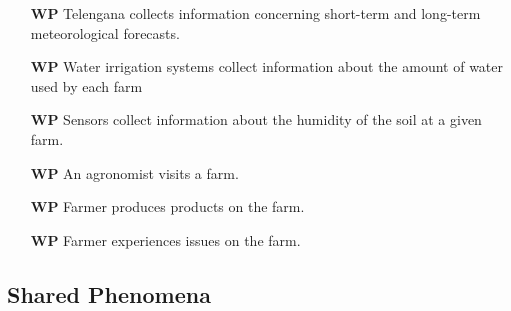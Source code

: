 \begin{itemize}
    \item [\textbf{WP}] Telengana collects information concerning short-term and long-term meteorological forecasts.
    \item [\textbf{WP}] Water irrigation systems collect information about the amount of water used by each farm
    \item [\textbf{WP}] Sensors collect information about the humidity of the soil at a given farm.
    \item [\textbf{WP}] An agronomist visits a farm.
    \item [\textbf{WP}] Farmer produces products on the farm.
    \item [\textbf{WP}] Farmer experiences issues on the farm.
\end{itemize}

\subsection{Shared Phenomena}

